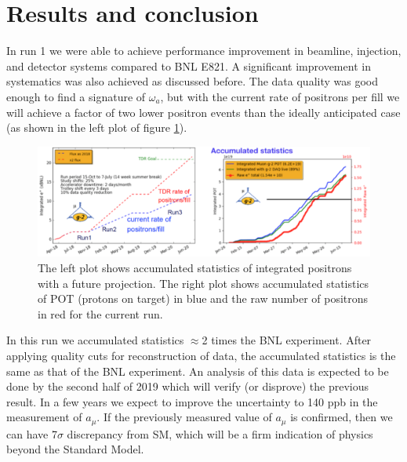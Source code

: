 \documentclass[journal,article,submit,moreauthors,pdftex,10pt,a4paper]{Definitions/mdpi}
\begin{document}
\section{Results and conclusion}
In run 1 we were able to achieve performance improvement in 
beamline, injection, and detector systems compared to BNL E821. 
A significant improvement in systematics was also achieved as discussed before. 
The data quality was good enough to find a signature of $\omega_a$, but with the current 
rate of positrons per fill we will achieve a factor of two lower positron events than the ideally 
anticipated case (as shown in the left plot of figure \ref{fig11}). 
\begin{figure}[H]
\centering
\includegraphics[width=11 cm]{statistics.png}
\caption{\label{fig11} The left plot shows accumulated statistics of integrated positrons with a future projection. 
The right plot shows accumulated statistics of POT (protons on target) in blue and the raw number of positrons in red for the current run.}
\end{figure} 
In this run we accumulated statistics $\approx$2 times the BNL experiment. 
After applying quality cuts for reconstruction of data, the accumulated statistics is the same as that 
of the BNL experiment. An analysis of this data is expected to be done by the second half of 2019 
which will verify (or disprove) the previous result. 
In a few years we expect to improve the uncertainty to 140 ppb in the measurement of $a_{\mu}$.
If the previously measured value of $a_{\mu}$ is confirmed, then we can have 7$\sigma$
discrepancy from SM, which will be a firm indication of physics beyond the Standard Model. 
\vspace{6pt} 


\end{document}
